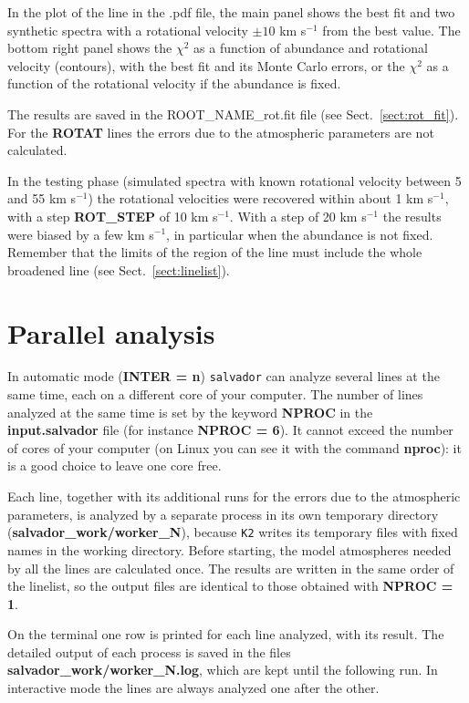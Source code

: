 \documentclass[modern]{aastex701}
\begin{document}
In the plot of the line in the .pdf file, the main panel shows the best fit and two synthetic spectra with a rotational velocity $\pm 10$ km s$^{-1}$ from the best value. The bottom right panel shows the $\chi^2$ as a function of abundance and rotational velocity (contours), with the best fit and its Monte Carlo errors, or the $\chi^2$ as a function of the rotational velocity if the abundance is fixed. 

The results are saved in the ROOT\_NAME\_rot.fit file (see Sect.~\ref{sect:rot_fit}). For the {\bf ROTAT} lines the errors due to the atmospheric parameters are not calculated.

In the testing phase (simulated spectra with known rotational velocity between 5 and 55 km s$^{-1}$) the rotational velocities were recovered within about 1 km s$^{-1}$, with a step {\bf ROT\_STEP} of 10 km s$^{-1}$. With a step of 20 km s$^{-1}$ the results were biased by a few km s$^{-1}$, in particular when the abundance is not fixed. Remember that the limits of the region of the line must include the whole broadened line (see Sect.~\ref{sect:linelist}).

\section{Parallel analysis} \label{sect:parallel}
\hrulefill

In automatic mode ({\bf INTER = n}) \texttt{salvador} can analyze several lines at the same time, each on a different core of your computer. The number of lines analyzed at the same time is set by the keyword {\bf NPROC} in the {\bf input.salvador} file (for instance {\bf NPROC = 6}). It cannot exceed the number of cores of your computer (on Linux you can see it with the command {\bf nproc}): it is a good choice to leave one core free. 

Each line, together with its additional runs for the errors due to the atmospheric parameters, is analyzed by a separate process in its own temporary directory ({\bf salvador\_work/worker\_N}), because \texttt{K2} writes its temporary files with fixed names in the working directory. Before starting, the model atmospheres needed by all the lines are calculated once. The results are written in the same order of the linelist, so the output files are identical to those obtained with {\bf NPROC = 1}. 

On the terminal one row is printed for each line analyzed, with its result. The detailed output of each process is saved in the files {\bf salvador\_work/worker\_N.log}, which are kept until the following run. In interactive mode the lines are always analyzed one after the other. 
\end{document}

